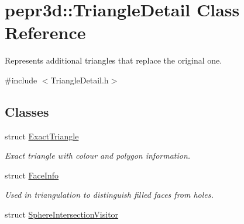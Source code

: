 \hypertarget{classpepr3d_1_1_triangle_detail}{}\section{pepr3d\+::Triangle\+Detail Class Reference}
\label{classpepr3d_1_1_triangle_detail}


Represents additional triangles that replace the original one.  




{\ttfamily \#include $<$Triangle\+Detail.\+h$>$}

\subsection*{Classes}
\begin{DoxyCompactItemize}
\item 
struct \mbox{\hyperlink{structpepr3d_1_1_triangle_detail_1_1_exact_triangle}{Exact\+Triangle}}
\begin{DoxyCompactList}\small\item\em Exact triangle with colour and polygon information. \end{DoxyCompactList}\item 
struct \mbox{\hyperlink{structpepr3d_1_1_triangle_detail_1_1_face_info}{Face\+Info}}
\begin{DoxyCompactList}\small\item\em Used in triangulation to distinguish filled faces from holes. \end{DoxyCompactList}\item 
struct \mbox{\hyperlink{structpepr3d_1_1_triangle_detail_1_1_sphere_intersection_visitor}{Sphere\+Intersection\+Visitor}}
\end{DoxyCompactItemize}
